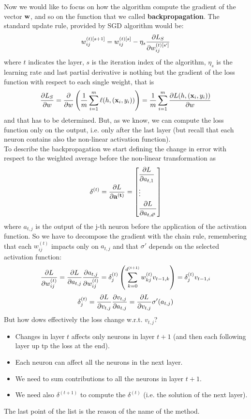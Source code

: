 \documentclass[12pt]{report}
\theoremstyle{plain}
\begin{document}
\begin{flushleft}
Now we would like to focus on how the algorithm compute the gradient of the vector $\vb{w}$, and so on the function that we called \textbf{backpropagation}. The standard update rule, provided by SGD algorithm would be:
\[ w_{ij}^{(t)[s+1]}= w_{ij}^{(t)[s]}-\eta_s\pdv{L_S}{w_{ij}^{(t)[s`]}} \]
where $t$ indicates the layer, $s$ is the iteration index of the algorithm, $\eta_s$ is the learning rate and last partial derivative is nothing but the gradient of the loss function with respect to each single weight, that is
\[ \pdv{L_S}{w}=\pdv{w}\left(\frac{1}{m}\sum_{i=1}^m\ell(h,(\vb{x}_i,y_i))\right)=\frac{1}{m}\sum_{i=1}^m\pdv{L(h,(\vb{x}_i,y_i))}{w} \]
and that has to be determined. But, as we know, we can compute the loss function only on the output, i.e. only after the last layer (but recall that each neuron contains also the non-linear activation function).\\
To describe the backpropagation we start defining the change in error with respect to the weighted average before the non-linear transformation as
\[ \delta^{(t)}=\pdv{L}{\vb{a^{(t)}}}=\left[\begin{aligned}&\pdv{L}{a_{t,1}}\\&\vdots\\&\pdv{L}{a_{t,d^t}} \end{aligned}\right] \]
where $a_{t,j}$ is the output of the j-th neuron before the application of the activation function. So we have to decompose the gradient with the chain rule, remembering that each $w_{ij}^{(t)}$ impacts only on $a_{t,j}$ and that $\sigma'$ depends on the selected activation function:
\[ \pdv{L}{w_{ij}^{(t)}}=\pdv{L}{a_{t,j}}\pdv{a_{t,j}}{w_{ij}^{(t)}}=\delta_j^{(t)}\left(\sum_{k=0}^{d^{(t+1)}}w_{kj}^{(t)}v_{t-1,k}\right)=\delta_j^{(t)}v_{t-1,i} \]
\[ \delta_j^{(t)}=\pdv{L}{v_{t,j}}\pdv{v_{t,j}}{a_{t,j}}=\pdv{L}{v_{t,j}}\sigma'(a_{t,j}) \]
But how dows effectively the loss change w.r.t. $v_{t,j}$?
\begin{itemize}
	\item Changes in layer $t$ affects only neurons in layer $t+1$ (and then each following layer up tp the loss at the end).
	\item Each neuron can affect all the neurons in the next layer.
	\item We need to sum contributions to all the neurons in layer $t+1$.
	\item We need also $\delta^{(t+1)}$ to compute the $\delta^{(t)}$ (i.e. the solution of the next layer). 
\end{itemize}
The last point of the list is the reason of the name of the method.

\end{flushleft}
\end{document}
